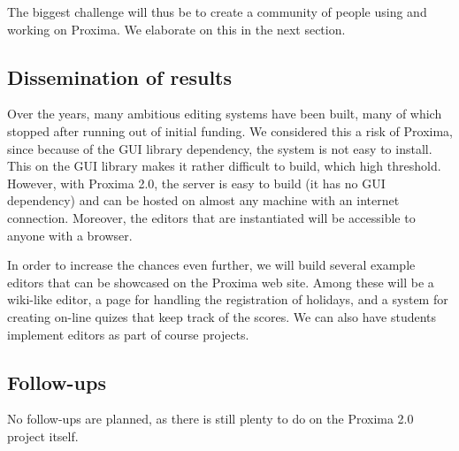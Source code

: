 \documentclass[10pt]{article}
\begin{document}
The biggest challenge will thus be to create a community of people using and working on Proxima. We elaborate on this in the next section.

\subsection{Dissemination of results}

Over the years, many ambitious editing systems have been built, many of which stopped after running out of initial funding. We considered this a risk of Proxima, since because of the GUI library dependency, the system is not easy to install. This on the GUI library makes it rather difficult to build, which high threshold. However, with Proxima 2.0, the server is easy to build (it has no GUI dependency) and can be hosted on almost any machine with an internet connection. Moreover, the editors that are instantiated will be accessible to anyone with a browser.

In order to increase the chances even further, we will build several example editors that can be showcased on the Proxima web site. Among these will be a wiki-like editor, a page for handling the registration of holidays,  and a system for creating on-line quizes that keep track of the scores. We can also have students implement editors as part of course projects.


\subsection{Follow-ups}
%
% 
No follow-ups are planned, as there is still plenty to do on the Proxima 2.0 project itself.

\end{document}
